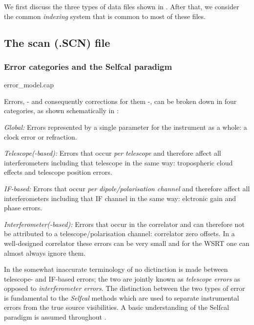 	We first discuss the three types of data files shown in
. After that, we consider the common {\em indexing}
system that is common to most of these files.

\subsection{ The scan (.SCN) file }
\label{.scn.file}




\subsubsection{ Error categories and the Selfcal paradigm }
\label{.selfcal}

 {error_model.cap}

	Errors, - and consequently corrections for them -, can be broken down
in four categories, as shown schematically in :

\bi
\item   {\em Global:} Errors represented by a single parameter for the
instrument as a whole: \eg a clock error or refraction.

\item   {\em Telescope(-based):} Errors that occur {\em per telescope} and
therefore affect all interferometers including that telescope in the same way:
\eg tropospheric cloud effects and telescope position errors.

\item   {\em IF-based:} Errors that occur {\em per dipole/polarisation channel}
 and therefore affect all interferometers including that IF channel in the same
way: \eg elctronic gain and phase errors.

\item   {\em Interferometer(-based):} Errors that occur in the correlator and
can therefore not be attributed to a telescope/polarisation channel: \eg
correlator zero offsets. In a well-designed correlator these errors can be very
small and for the WSRT one can almost always ignore them.
\ei

	In the somewhat inaccurate terminology of \NEWSTAR no dictinction is
made between telescope- and IF-based errors; the two are jointly known as {\em
telescope errors} as opposed to {\em interferometer errors}. The distinction
between the two types of error is fundamental to the {\em Selfcal} methods
which are used to separate instrumental errors from the true source
visibilities. A basic understanding of the Selfcal paradigm is assumed
throughout \NEWSTAR.

